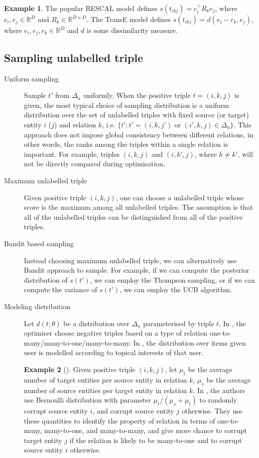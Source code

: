 \documentclass{article}
\theoremstyle{definition}
\newtheorem{example}{Example}%
\begin{document}
\begin{example}
The popular RESCAL model defines $s(t_{ikj}) = e_i^\top R_k e_j$, where $e_i, e_j \in \mathbb{R}^{D}$ and $R_k \in \mathbb{R}^{D\times D}$. The TransE model defines $s(t_{ikj}) = d(e_i - r_k, e_j)$, where $e_i, e_j, r_k \in \mathbb{R}^{D}$ and $d$ is some dissimilarity measure. 
\end{example}

\subsection{Sampling unlabelled triple}
\begin{description}
\item[Uniform sampling] Sample $t'$ from $\Delta_u$ uniformly. When the positive triple $t = (i,k,j)$ is given, the most typical choice of sampling distribution is a uniform distribution over the set of unlabelled triples with fixed source (or target) entity $i$ ($j$) and relation $k$, i.e. $\{t':t'=(i,k,j') \text{ or } (i',k,j) \in \Delta_u\}$. This approach does not impose global consistency between different relations, in other words, the ranks among the triples within a single relation is important. For example, triples $(i,k,j)$ and $(i,k',j)$, where $k \neq k'$, will not be directly compared during optimisation.
\item[Maximum unlabelled triple] Given positive triple $(i,k,j)$, one can choose a unlabelled triple whose score is the maximum among all unlabelled triples. The assumption is that all of the unlabelled triples can be distinguished from all of the positive triples. 
\item[Bandit based sampling] Instead choosing maximum unlabelled triple, we can alternatively use Bandit approach to sample. For example, if we can compute the posterior distribution of $s(t')$, we can employ the Thompson sampling, or if we can compute the variance of $s(t')$, we can employ the UCB algorithm.
\item[Modeling distribution] Let $d(t;\theta)$ be a distribution over $\Delta_u$ parameterised by triple $t$. In \cite{Wang2014}, the optimiser choose negative triples based on a type of relation one-to-many/many-to-one/many-to-many. In \cite{Liang2015}, the distribution over items given user is modelled according to topical interests of that user. 
\begin{example}[\cite{Wang2014}]
Given positive triple $(i,k,j)$, let $\mu_t$ be the average number of target entities per source entity in relation $k$, $\mu_s$ be the average number of source entities per target entity in relation $k$. In \cite{Wang2014}, the authors use Bernoulli distribution with parameter $\mu_t/(\mu_s + \mu_t)$ to randomly corrupt source entity $i$, and corrupt source entity $j$ otherwise. They use these quantities to identify the property of relation in terms of one-to-many, many-to-one, and many-to-many, and give more chance to corrupt target entity $j$ if the relation is likely to be many-to-one and to corrupt source entity $i$ otherwise.
\end{example}
\end{description}
\end{document}
